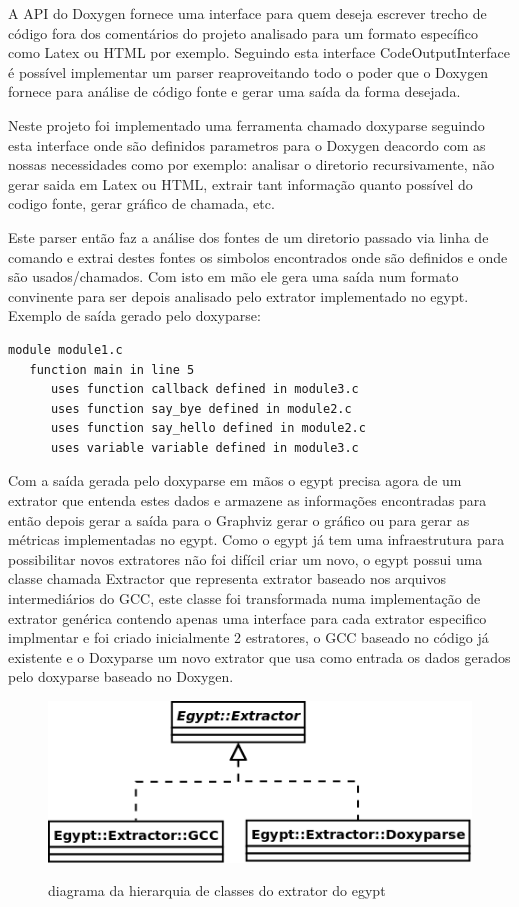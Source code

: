 A API do Doxygen fornece uma interface para quem deseja escrever trecho de código fora dos comentários do projeto analisado para um formato específico como Latex ou HTML por exemplo. Seguindo esta interface CodeOutputInterface é possível implementar um parser reaproveitando todo o poder que o Doxygen fornece para análise de código fonte e gerar uma saída da forma desejada.

Neste projeto foi implementado uma ferramenta chamado doxyparse seguindo esta interface onde são definidos parametros para o Doxygen deacordo com as nossas necessidades como por exemplo: analisar o diretorio recursivamente, não gerar saida em Latex ou HTML, extrair tant informação quanto possível do codigo fonte, gerar gráfico de chamada, etc.

Este parser então faz a análise dos fontes de um diretorio passado via linha de comando e extrai destes fontes os simbolos encontrados onde são definidos e onde são usados/chamados. Com isto em mão ele gera uma saída num formato convinente para ser depois analisado pelo extrator implementado no egypt. Exemplo de saída gerado pelo doxyparse:

\begin{verbatim}
module module1.c
   function main in line 5
      uses function callback defined in module3.c
      uses function say_bye defined in module2.c
      uses function say_hello defined in module2.c
      uses variable variable defined in module3.c
\end{verbatim}

Com a saída gerada pelo doxyparse em mãos o egypt precisa agora de um extrator que entenda estes dados e armazene as informações encontradas para então depois gerar a saída para o Graphviz gerar o gráfico ou para gerar as métricas implementadas no egypt. Como o egypt já tem uma infraestrutura para possibilitar novos extratores não foi difícil criar um novo, o egypt possui uma classe chamada Extractor que representa extrator baseado nos arquivos intermediários do GCC, este classe foi transformada numa implementação de extrator genérica contendo apenas uma interface para cada extrator especifico implmentar e foi criado inicialmente 2 estratores, o GCC baseado no código já existente e o Doxyparse um novo extrator que usa como entrada os dados gerados pelo doxyparse baseado no Doxygen.

\begin{figure}[h]
\center
\includegraphics[scale=0.5]{imagens/egypt-diagram-extractor}
\label{egypt-diagram-extractor}
\caption{diagrama da hierarquia de classes do extrator do egypt}
\end{figure}

